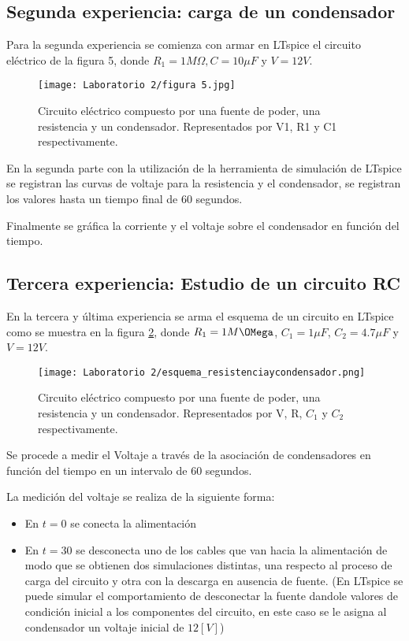 \documentclass[letterpaper,11pt]{article} %
\begin{document}
\subsection{Segunda experiencia: carga de un condensador}
Para la segunda experiencia se comienza con armar en LTspice el circuito eléctrico de la figura 5, donde $R_1=1M\Omega, C=10\mu F$ y $V = 12V$.\\


\begin{figure}
    \centering
    \texttt{[image: Laboratorio 2/figura 5.jpg]}
    \caption{Circuito eléctrico compuesto por una fuente de poder, una resistencia y un condensador. Representados por V1, R1 y C1  respectivamente.}
    \label{fig:mati_porfavor_basta}
\end{figure}
En la segunda parte con la utilización de la herramienta de simulación de LTspice se registran las curvas de voltaje para la resistencia y el condensador, se registran los valores hasta un tiempo final de 60 segundos.

Finalmente se gráfica la corriente y el voltaje sobre el condensador en función del tiempo.


\subsection{Tercera experiencia: Estudio de un circuito RC}
En la tercera y última experiencia se arma el esquema de un circuito en LTspice como se muestra en la figura \ref{fig:experiencia3esquema}, donde $R_1=1M\OMega$, $C_1=1\mu F$, $C_2=4.7\mu F$ y $V=12V$.
\begin{figure}
    \centering
    \texttt{[image: Laboratorio 2/esquema\_resistenciaycondensador.png]}
    \caption{Circuito eléctrico compuesto por una fuente de poder, una resistencia y un condensador. Representados por V, R, $C_{1}$ y $C_{2}$ respectivamente.}
    \label{fig:experiencia3esquema}
\end{figure}
Se procede a medir el Voltaje a través de la asociación de condensadores en función del tiempo en un intervalo de 60 segundos.

La medición del voltaje se realiza de la siguiente forma:
\begin{itemize}
    \item En $t=0$ se conecta la alimentación%
    \item En $t=30$ se desconecta uno de los cables que van hacia la alimentación de modo que se obtienen dos simulaciones distintas, una respecto al proceso de carga del circuito y otra con la descarga en ausencia de fuente. (En LTspice se puede simular el comportamiento de desconectar la fuente dandole valores de condición inicial a los componentes del circuito, en este caso se le asigna al condensador un voltaje inicial de $12 [V]$)
\end{itemize}{}\\
\end{document}
